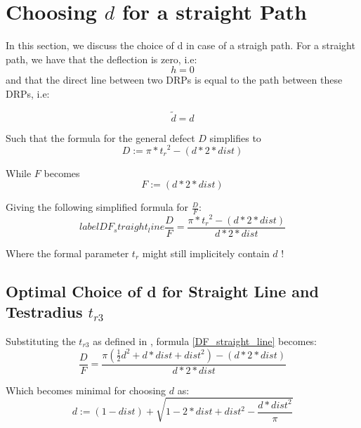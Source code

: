\section{Choosing $d$ for a straight Path}
In this section, we discuss the choice of d in case of a straigh path.
For a straight path, we have that the deflection is zero, i.e:
\begin{equation}
 \label{straightDeflection}
  h=0
\end{equation}
and that the direct line between two DRPs is equal to the path between these DRPs, i.e:

\begin{equation}
 \label{straightPath}
  \tilde{d}=d
\end{equation}

Such that the formula for the general defect $D$ \label{generalDefectFormula} 
simplifies to
\begin{equation}
 \label{defectStraightPath}
	D:=\pi*{t_r}^2 -(d*2*dist)
\end{equation}

While $F$ becomes
\begin{equation}
  F:=(d*2*dist)
\end{equation}


Giving the following simplified formula for $\frac{D}{F}$:
\begin{equation}
label{DF_straight_line}
	\frac{D}{F}=\frac{\pi*{t_r}^2 -(d*2*dist)}{d*2*dist} 
\end{equation}

Where the formal parameter $t_r$ might still implicitely contain $d$ !


\subsection{Optimal Choice of d for Straight Line and Testradius $t_{r3}$}
Substituting the $t_{r3}$ as defined in  \label{testradius_tr3},
formula \ref{DF_straight_line} becomes:
\begin{equation}
\label{DF_straight_line_tr3}
\frac{D}{F}=\frac{\pi(\frac{1}{2}d^2+d*dist+dist^2) -(d*2*dist)}{d*2*dist}
\end{equation}

Which becomes minimal for choosing $d$ as:
\begin{equation}
\label{optimal_d_straight_line_tr3}
 d:=(1-dist)+\sqrt{1-2*dist+dist^2-\frac{d*dist^2}{\pi}} 
\end{equation}




